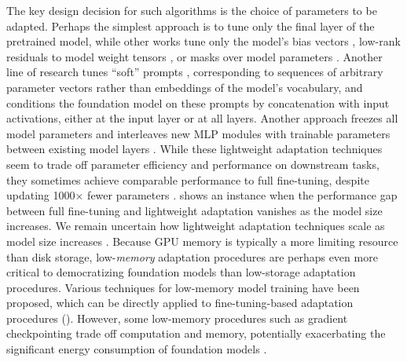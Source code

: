 The key design decision for such algorithms is the choice of parameters to be adapted. Perhaps the simplest approach is to tune only the final layer of the pretrained model, while other works tune only the model's bias vectors \citep{zaken2021bitfit}, low-rank residuals to model weight tensors \citep{hu2021lora}, or masks over model parameters \citep{zhao2020masking}. Another line of research tunes ``soft'' prompts \citep{li2021prefix,qin-eisner-2021,liu2021prompt, lester2021power,hambardzumyan-etal-2021-warp}, corresponding to sequences of arbitrary parameter vectors rather than embeddings of the model's vocabulary, and conditions the foundation model on these prompts by concatenation with input activations, either at the input layer or at all layers. Another approach freezes all model parameters and interleaves new MLP modules with trainable parameters between existing model layers \citep{houlsby19adapter}. While these lightweight adaptation techniques seem to trade off parameter efficiency and performance on downstream tasks, they sometimes achieve comparable performance to full fine-tuning, despite updating 1000$\times$ fewer parameters \citep{zaken2021bitfit,li2021prefix,hu2021lora}. \citet{lester2021power} shows an instance when the performance gap between full fine-tuning and lightweight adaptation vanishes as the model size increases. 
We remain uncertain how lightweight adaptation techniques scale as model size increases \citep{aghajanyan2020intrinsic}. Because GPU memory is typically a more limiting resource than disk storage, low-\textit{memory} adaptation procedures are perhaps even more critical to democratizing foundation models than low-storage adaptation procedures. Various techniques for low-memory model training have been proposed, which can be directly applied to fine-tuning-based adaptation procedures (). However, some low-memory procedures such as gradient checkpointing \cite{gradient-checkpointing} trade off computation and memory, potentially exacerbating the significant energy consumption of foundation models \cite{bender2021}.

